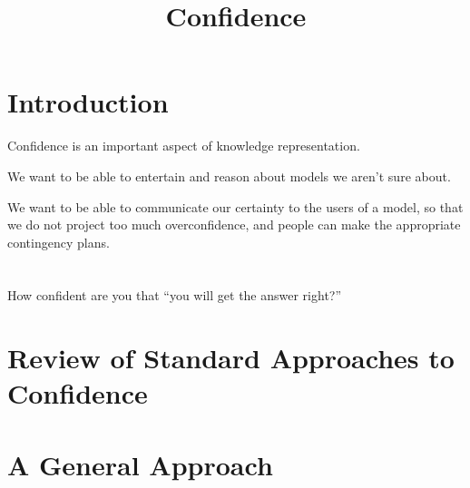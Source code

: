 \documentclass{article}
\title{Confidence}
\begin{document}
\maketitle    

\section{Introduction}
Confidence is an important aspect of knowledge representation.

We want to be able to entertain and reason about models we aren't sure about.

We want to be able to communicate our certainty to the users of a model, so that
we do not project too much overconfidence, and people can make the appropriate
contingency plans. 




\section{}
How confident are you that ``you will get the answer right?''




\section{Review of Standard Approaches to Confidence}
\section{A General Approach}
\end{document}
